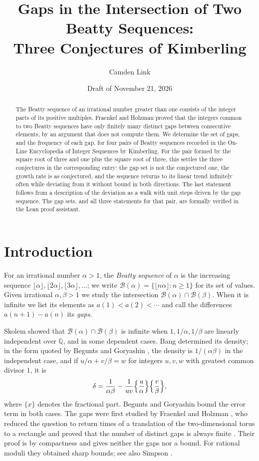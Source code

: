 \documentclass[12pt]{article}
\title{Gaps in the Intersection of Two Beatty Sequences:\\ Three Conjectures of Kimberling}
\author{Camden Link}
\date{Draft of November 21, 2026}
\newcommand{\fl}[1]{\lfloor #1 \rfloor}
\newcommand{\B}{\mathcal{B}}
\newcommand{\Q}{\mathbb{Q}}
\theoremstyle{plain}
\theoremstyle{remark}
\begin{document}
\maketitle

\begin{abstract}
The Beatty sequence of an irrational number greater than one consists of the integer parts of
its positive multiples. Fraenkel and Holzman proved that the integers common to two Beatty
sequences have only finitely many distinct gaps between consecutive elements, by an argument
that does not compute them. We determine the set of gaps, and the frequency of each gap, for
four pairs of Beatty sequences recorded in the On-Line Encyclopedia of Integer Sequences by
Kimberling. For the pair formed by the square root of three and one plus the square root of
three, this settles the three conjectures in the corresponding entry: the gap set is not the
conjectured one, the growth rate is as conjectured, and the sequence returns to its linear trend
infinitely often while deviating from it without bound in both directions. The last statement
follows from a description of the deviation as a walk with unit steps driven by the gap
sequence. The gap sets, and all three statements for that pair, are formally verified in the
Lean proof assistant.
\end{abstract}

\section{Introduction}

For an irrational number $\alpha>1$, the \emph{Beatty sequence} of $\alpha$ is the increasing
sequence $\fl{\alpha},\fl{2\alpha},\fl{3\alpha},\dots$; we write
$\B(\alpha)=\{\fl{n\alpha} : n\ge 1\}$ for its set of values. Given irrational
$\alpha,\beta>1$ we study the intersection $\B(\alpha)\cap\B(\beta)$. When it is infinite we
list its elements as $a(1)<a(2)<\cdots$ and call the differences $a(n+1)-a(n)$ its
\emph{gaps}.

Skolem \cite{skolem} showed that $\B(\alpha)\cap\B(\beta)$ is infinite when $1,1/\alpha,1/\beta$
are linearly independent over $\Q$, and in some dependent cases. Bang \cite{bang} determined
its density; in the form quoted by Begunts and Goryashin \cite[Theorem~1]{bg25}, the density is
$1/(\alpha\beta)$ in the independent case, and if $u/\alpha+v/\beta=w$ for integers $u,v,w$
with greatest common divisor $1$, it is
\begin{equation}\label{eq:bang}
\delta=\frac{1}{\alpha\beta}-\frac{1}{uv}\Bigl\{\frac{u}{\alpha}\Bigr\}\Bigl\{\frac{v}{\beta}\Bigr\},
\end{equation}
where $\{x\}$ denotes the fractional part. Begunts and Goryashin \cite{bg22,bg25} bound the
error term in both cases. The gaps were first studied by Fraenkel and Holzman \cite{fh}, who
reduced the question to return times of a translation of the two-dimensional torus to a
rectangle and proved that the number of distinct gaps is always finite
\cite[Corollary~5.2]{fh}. Their proof is by compactness and gives neither the gaps nor a bound.
For rational moduli they obtained sharp bounds; see also Simpson \cite{simpson}.
\end{document}

